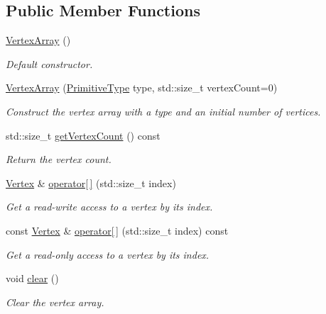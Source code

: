 \subsection*{Public Member Functions}
\begin{DoxyCompactItemize}
\item 
\hyperlink{classsf_1_1_vertex_array_a15729e01df8fc0021f9774dfb56295c1}{Vertex\+Array} ()
\begin{DoxyCompactList}\small\item\em Default constructor. \end{DoxyCompactList}\item 
\hyperlink{classsf_1_1_vertex_array_a4bb1c29a0e3354a035075899d84f02f9}{Vertex\+Array} (\hyperlink{group__graphics_ga5ee56ac1339984909610713096283b1b}{Primitive\+Type} type, std\+::size\+\_\+t vertex\+Count=0)
\begin{DoxyCompactList}\small\item\em Construct the vertex array with a type and an initial number of vertices. \end{DoxyCompactList}\item 
std\+::size\+\_\+t \hyperlink{classsf_1_1_vertex_array_abda90e8d841a273d93164f0c0032bd8d}{get\+Vertex\+Count} () const
\begin{DoxyCompactList}\small\item\em Return the vertex count. \end{DoxyCompactList}\item 
\hyperlink{classsf_1_1_vertex}{Vertex} \& \hyperlink{classsf_1_1_vertex_array_a6006676417d91f42d0278f1abcfe4352}{operator\mbox{[}$\,$\mbox{]}} (std\+::size\+\_\+t index)
\begin{DoxyCompactList}\small\item\em Get a read-\/write access to a vertex by its index. \end{DoxyCompactList}\item 
const \hyperlink{classsf_1_1_vertex}{Vertex} \& \hyperlink{classsf_1_1_vertex_array_a6bfcf91c01c754e86ee8b44b6c79441b}{operator\mbox{[}$\,$\mbox{]}} (std\+::size\+\_\+t index) const
\begin{DoxyCompactList}\small\item\em Get a read-\/only access to a vertex by its index. \end{DoxyCompactList}\item 
void \hyperlink{classsf_1_1_vertex_array_a3654c424aca1f9e468f369bc777c839c}{clear} ()
\begin{DoxyCompactList}\small\item\em Clear the vertex array. \end{DoxyCompactList}\item 

\end{DoxyCompactItemize}
